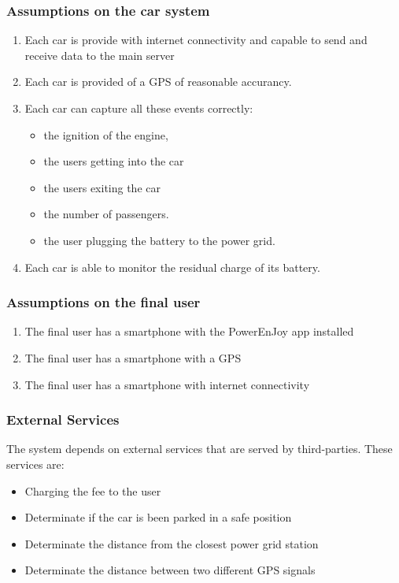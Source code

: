 \documentclass[11pt]{article} %
\newcommand{\pe}{PowerEnJoy }
\begin{document}
\subsubsection{Assumptions on the car system}
\begin{enumerate}
	\item  Each car is provide with internet connectivity and capable to send and receive data to the main server
	\item  Each car is provided of a GPS of reasonable accurancy.
	\item  Each car can capture all these events correctly:
		\begin{itemize}
			\item the ignition of the engine, 
			\item the users getting into the car
			\item the users exiting the car 
			\item the number of passengers.
			\item the user plugging the battery to the power grid.
		\end{itemize}
	\item Each car is able to monitor the residual charge of its battery.
\end{enumerate}


\subsubsection{Assumptions on the final user}
\begin{enumerate}
	\item The final user has a smartphone with the \pe app installed
	\item The final user has a smartphone with a GPS
	\item The final user has a smartphone with internet connectivity
\end{enumerate}
  
  \subsubsection{External Services}
 The system depends on external services that are served by third-parties. These services are:
  \begin{itemize}
  	\item Charging the fee to the user
  	\item Determinate if the car is been parked in a safe position
  	\item Determinate the distance from the closest power grid station
  	\item Determinate the distance between two different GPS signals
  \end{itemize}
  	
\end{document}
